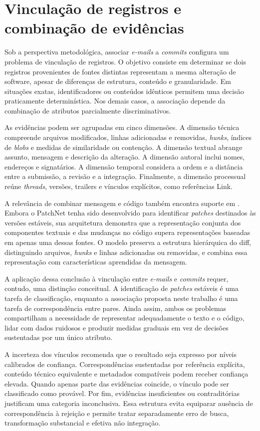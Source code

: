 \section{Vinculação de registros e combinação de evidências}
Sob a perspectiva metodológica, associar \textit{e-mails} a \textit{commits} configura um problema de vinculação de registros. O objetivo consiste em determinar se dois registros provenientes de fontes distintas representam a mesma alteração de software, apesar de diferenças de estrutura, conteúdo e granularidade. Em situações exatas, identificadores ou conteúdos idênticos permitem uma decisão praticamente determinística. Nos demais casos, a associação depende da combinação de atributos parcialmente discriminativos.

As evidências podem ser agrupadas em cinco dimensões. A dimensão técnica compreende arquivos modificados, linhas adicionadas e removidas, \textit{hunks}, índices de\textit{ blobs} e medidas de similaridade ou contenção. A dimensão textual abrange assunto, mensagem e descrição da alteração. A dimensão autoral inclui nomes, endereços e signatários. A dimensão temporal considera a ordem e a distância entre a submissão, a revisão e a integração. Finalmente, a dimensão processual reúne \textit{threads}, versões, trailers e vínculos explícitos, como referências Link.

A relevância de combinar mensagem e código também encontra suporte em \cite{hoang2021patchnet}. Embora o PatchNet tenha sido desenvolvido para identificar \textit{patches} destinados às versões estáveis, sua arquitetura demonstra que a representação conjunta dos componentes textuais e das mudanças no código supera representações baseadas em apenas uma dessas fontes. O modelo preserva a estrutura hierárquica do diff, distinguindo arquivos, \textit{hunks} e linhas adicionadas ou removidas, e combina essa representação com características aprendidas da mensagem. 

A aplicação dessa conclusão à vinculação entre \textit{e-mails} e \textit{commits} requer, contudo, uma distinção conceitual. A identificação de \textit{patches} estáveis é uma tarefa de classificação, enquanto a associação proposta neste trabalho é uma tarefa de correspondência entre pares. Ainda assim, ambos os problemas compartilham a necessidade de representar adequadamente o texto e o código, lidar com dados ruidosos e produzir medidas graduais em vez de decisões sustentadas por um único atributo.

A incerteza dos vínculos recomenda que o resultado seja expresso por níveis calibrados de confiança. Correspondências sustentadas por referência explícita, conteúdo técnico equivalente e metadados compatíveis podem receber confiança elevada. Quando apenas parte das evidências coincide, o vínculo pode ser classificado como provável. Por fim, evidências insuficientes ou contraditórias justificam uma categoria inconclusiva. Essa estrutura evita equiparar ausência de correspondência à rejeição e permite tratar separadamente erro de busca, transformação substancial e efetiva não integração.

